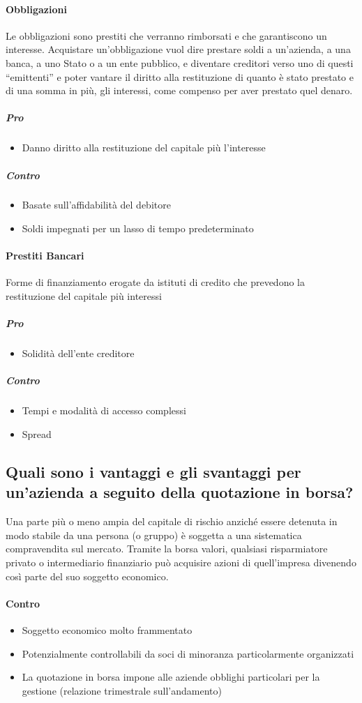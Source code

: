 \documentclass[12pt]{article}
\begin{document}
\paragraph{Obbligazioni}
Le obbligazioni sono prestiti che verranno rimborsati e che garantiscono un interesse. Acquistare un’obbligazione vuol dire prestare soldi a un’azienda, a una banca, a uno Stato o a un ente pubblico, e diventare creditori verso uno di questi “emittenti” e poter vantare il diritto alla restituzione di quanto è stato prestato e di una somma in più, gli interessi, come compenso per aver prestato quel denaro.
\subparagraph{Pro}
\begin{itemize}
    \item Danno diritto alla restituzione del capitale più l'interesse
\end{itemize}
\subparagraph{Contro}
\begin{itemize}
    \item Basate sull'affidabilità del debitore
    \item Soldi impegnati per un lasso di tempo predeterminato
\end{itemize}
\paragraph{Prestiti Bancari}
Forme di finanziamento erogate da istituti di credito che prevedono la restituzione del capitale più interessi
\subparagraph{Pro}
\begin{itemize}
    \item Solidità dell'ente creditore
\end{itemize}
\subparagraph{Contro}
\begin{itemize}
    \item Tempi e modalità di accesso complessi
    \item Spread
\end{itemize}
\subsection{Quali sono i vantaggi e gli svantaggi per un'azienda a seguito della quotazione in borsa?}
Una parte più o meno ampia del capitale di rischio anziché essere detenuta in modo stabile da una persona (o gruppo) è soggetta a una sistematica compravendita sul mercato. Tramite la borsa valori, qualsiasi risparmiatore privato o intermediario finanziario può acquisire azioni di quell’impresa divenendo così parte del suo soggetto economico.
\paragraph{Contro}
\begin{itemize}
    \item Soggetto economico molto frammentato
    \item Potenzialmente controllabili da soci di minoranza particolarmente organizzati
    \item La quotazione in borsa impone alle aziende obblighi particolari per la gestione (relazione trimestrale sull’andamento)
\end{itemize}
\end{document}
